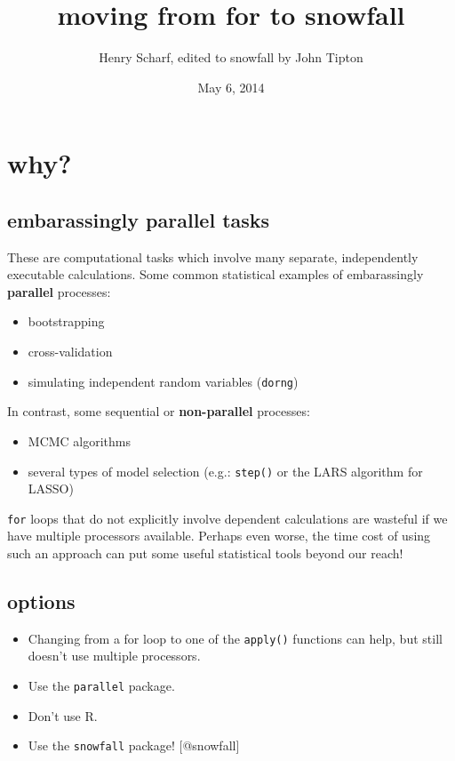 \documentclass[]{article}
\title{moving from for to snowfall}
\author{Henry Scharf, edited to snowfall by John Tipton}
\date{May 6, 2014}
\begin{document}
\maketitle


{
\hypersetup{linkcolor=black}
\setcounter{tocdepth}{2}
\tableofcontents
}
\section{why?}\label{why}

\subsection{embarassingly parallel
tasks}\label{embarassingly-parallel-tasks}

These are computational tasks which involve many separate, independently
executable calculations. Some common statistical examples of
embarassingly {\textbf{parallel}} processes:

\begin{itemize}
\itemsep1pt\parskip0pt
\item
  bootstrapping
\item
  cross-validation
\item
  simulating independent random variables (\texttt{dorng})
\end{itemize}

In contrast, some sequential or {\textbf{non-parallel}} processes:

\begin{itemize}
\itemsep1pt\parskip0pt
\item
  MCMC algorithms
\item
  several types of model selection (e.g.: \texttt{step()} or the LARS
  algorithm for LASSO)
\end{itemize}

\texttt{for} loops that do not explicitly involve dependent calculations
are wasteful if we have multiple processors available. Perhaps even
worse, the time cost of using such an approach can put some useful
statistical tools beyond our reach!

\subsection{options}\label{options}

\begin{itemize}
\itemsep1pt\parskip0pt
\item
  Changing from a for loop to one of the \texttt{apply()} functions can
  help, but still doesn't use multiple processors.
\item
  Use the \texttt{parallel} package.
\item
  Don't use R.
\item
  Use the \texttt{snowfall} package! {[}@snowfall{]}
\end{itemize}
\end{document}
